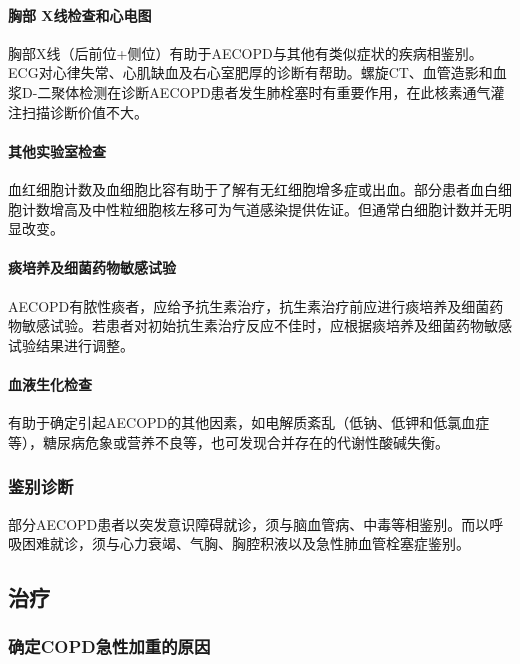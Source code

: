 \paragraph{胸部 X线检查和心电图}

胸部X线（后前位+侧位）有助于AECOPD与其他有类似症状的疾病相鉴别。ECG对心律失常、心肌缺血及右心室肥厚的诊断有帮助。螺旋CT、血管造影和血浆D-二聚体检测在诊断AECOPD患者发生肺栓塞时有重要作用，在此核素通气灌注扫描诊断价值不大。

\paragraph{其他实验室检查}

血红细胞计数及血细胞比容有助于了解有无红细胞增多症或出血。部分患者血白细胞计数增高及中性粒细胞核左移可为气道感染提供佐证。但通常白细胞计数并无明显改变。

\paragraph{痰培养及细菌药物敏感试验}

AECOPD有脓性痰者，应给予抗生素治疗，抗生素治疗前应进行痰培养及细菌药物敏感试验。若患者对初始抗生素治疗反应不佳时，应根据痰培养及细菌药物敏感试验结果进行调整。

\paragraph{血液生化检查}

有助于确定引起AECOPD的其他因素，如电解质紊乱（低钠、低钾和低氯血症等），糖尿病危象或营养不良等，也可发现合并存在的代谢性酸碱失衡。

\subsubsection{鉴别诊断}

部分AECOPD患者以突发意识障碍就诊，须与脑血管病、中毒等相鉴别。而以呼吸困难就诊，须与心力衰竭、气胸、胸腔积液以及急性肺血管栓塞症鉴别。

\subsection{治疗}

\subsubsection{确定COPD急性加重的原因}

